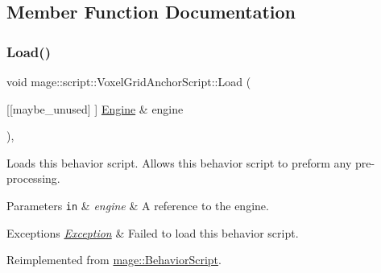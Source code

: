 \subsection{Member Function Documentation}
\mbox{\label{classmage_1_1script_1_1_voxel_grid_anchor_script_aca9d52f124cbedfe7daade62366d4c0a}} 
\subsubsection{\texorpdfstring{Load()}{Load()}}
{\footnotesize\ttfamily void mage\+::script\+::\+Voxel\+Grid\+Anchor\+Script\+::\+Load (\begin{DoxyParamCaption}\item[{\mbox{[}\mbox{[}maybe\+\_\+unused\mbox{]} \mbox{]} \mbox{\hyperlink{classmage_1_1_engine}{Engine}} \&}]{engine }\end{DoxyParamCaption})\hspace{0.3cm}{\ttfamily [override]}, {\ttfamily [virtual]}}

Loads this behavior script. Allows this behavior script to preform any pre-\/processing.


\begin{DoxyParams}[1]{Parameters}
\mbox{\tt in}  & {\em engine} & A reference to the engine. \\
\hline
\end{DoxyParams}

\begin{DoxyExceptions}{Exceptions}
{\em \mbox{\hyperlink{classmage_1_1_exception}{Exception}}} & Failed to load this behavior script. \\
\hline
\end{DoxyExceptions}


Reimplemented from \mbox{\hyperlink{classmage_1_1_behavior_script_ae7864876b2ffb1d1d8d8a56e3099f1f2}{mage\+::\+Behavior\+Script}}.

\mbox{\label{classmage_1_1script_1_1_voxel_grid_anchor_script_a7c717a96317052b07c8c90d9c2c73103}} 
